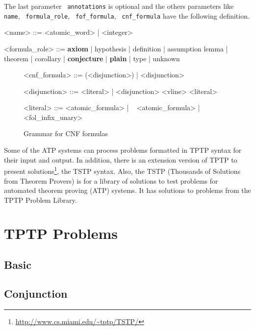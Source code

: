 \documentclass[12pt]{article}
\newcommand{\ttext}[1]{\texttt{\color{black} #1}}
\newcommand{\problemtptp}[3][c]{}
\begin{document}
The last parameter \ttext{annotations} is optional and the others parameters like
\ttext{name}, \ttext{formula_role}, \ttext{fof_formula}, \ttext{cnf_formula} have
the following definition.

\begin{grammar}
<name> ::= <atomic_word> | <integer>

<formula_role> ::= {\bf axiom} | hypothesis | definition | assumption
\alt lemma | theorem | corollary | {\bf conjecture}
 | {\bf plain }| type | unknown
\end{grammar}

\begin{figure}[!ht]
\centering
\label{syntax:cnfformula}
\begin{grammar}
<cnf_formula> ::= (<disjunction>) | <disjunction>

<disjunction> ::= <literal> | <disjunction> <vline> <literal>

<literal> ::= <atomic_formula> | ~ <atomic_formula> | <fol_infix_unary>
\end{grammar}
\caption{Grammar for CNF formulas}
\end{figure}

Some of the ATP systems can process problems formatted
in TPTP syntax for their input and output. In addition, there is an extension
version of TPTP to present solutions\footnote{\url{http://www.cs.miami.edu/~tptp/TSTP/}},
the TSTP syntax. Also, the TSTP (Thousands of Solutions from Theorem Provers) is
for a library of solutions to test problems for automated theorem proving (ATP)
systems. It has solutions to problems from the TPTP Problem Library.\par

\section{TPTP Problems}

\subsection{Basic}
\problemtptp[basic-1.tptp]{problems/basic/basic-1.tptp}{2}
\problemtptp[basic-2.tptp]{problems/basic/basic-2.tptp}{2}
\problemtptp[basic-3.tptp]{problems/basic/basic-3.tptp}{2}
\problemtptp[basic-4.tptp]{problems/basic/basic-4.tptp}{2}

\subsection{Conjunction}
\problemtptp[conj-1.tptp]{problems/conjunction/conj-1.tptp}{2}
\problemtptp[conj-2.tptp]{problems/conjunction/conj-2.tptp}{2}
\problemtptp[conj-3.tptp]{problems/conjunction/conj-3.tptp}{2}
\problemtptp[conj-4.tptp]{problems/conjunction/conj-4.tptp}{2}
\problemtptp[conj-5.tptp]{problems/conjunction/conj-5.tptp}{2}
\problemtptp[conj-6.tptp]{problems/conjunction/conj-6.tptp}{2}
\end{document}
